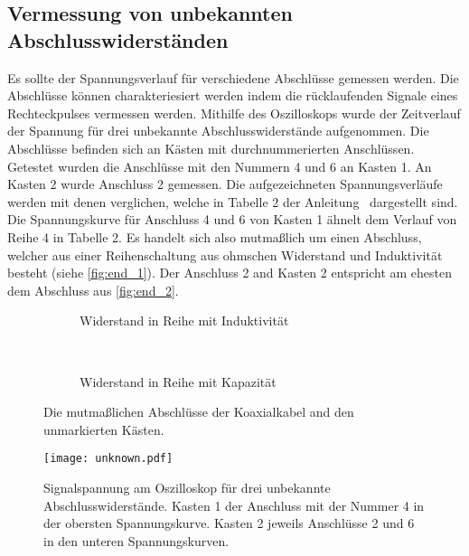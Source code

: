 \subsection{Vermessung von unbekannten Abschlusswiderständen}
Es sollte der Spannungsverlauf für verschiedene Abschlüsse gemessen werden. Die Abschlüsse können charakteriesiert werden indem die rücklaufenden
Signale eines Rechteckpulses vermessen werden.
Mithilfe des Oszilloskops wurde der Zeitverlauf der Spannung für drei unbekannte Abschlusswiderstände aufgenommen.
Die Abschlüsse befinden sich an Kästen mit durchnummerierten Anschlüssen.
Getestet wurden die Anschlüsse mit den Nummern 4 und 6 an Kasten 1. An Kasten 2 wurde Anschluss 2 gemessen.
Die aufgezeichneten Spannungsverläufe werden mit denen verglichen, welche in Tabelle 2 der Anleitung~\cite{v52} dargestellt sind.
Die Spannungskurve für Anschluss 4 und 6 von Kasten 1 ähnelt dem Verlauf von Reihe 4 in Tabelle 2.
Es handelt sich also mutmaßlich um einen Abschluss, welcher aus einer Reihenschaltung aus ohmschen Widerstand und Induktivität besteht (siehe
\autoref{fig:end_1}).
Der Anschluss 2 and Kasten 2 entspricht am ehesten dem Abschluss aus \autoref{fig:end_2}.

\begin{figure}
    \centering
    \begin{subfigure}[b]{0.45\textwidth}
      \centering
        
        \caption{Widerstand in Reihe mit Induktivität}
        \label{fig:end_1}
    \end{subfigure}
    ~ %
    \begin{subfigure}[b]{0.45\textwidth}
        \centering
        
        \caption{Widerstand in Reihe mit Kapazität}
        \label{fig:end_2}
    \end{subfigure}
    \caption{Die mutmaßlichen Abschlüsse der Koaxialkabel and den unmarkierten Kästen.}\label{fig:ends}
\end{figure}


\begin{figure}
  \centering
  \texttt{[image: unknown.pdf]}
  \caption{%
    Signalspannung am Oszilloskop für drei unbekannte Abschlusswiderstände.
    Kasten 1 der Anschluss mit der Nummer 4 in der obersten Spannungskurve. Kasten 2 jeweils Anschlüsse 2 und 6 in den
    unteren Spannungskurven.
  }\label{fig:unknown}
\end{figure}


